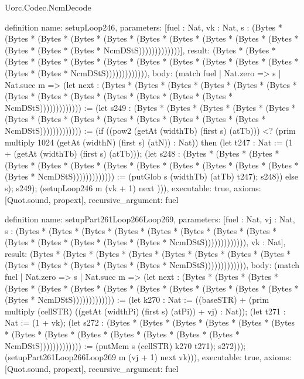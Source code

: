 \begin{lexlean}{Uorc.Codec.NcmDecode}
\begin{semanticmodule}
definition{
  name: setupLoop246,
  parameters: [fuel : Nat, vk : Nat, s : (Bytes * (Bytes * (Bytes * (Bytes * (Bytes * (Bytes * (Bytes * (Bytes * (Bytes * (Bytes * (Bytes * (Bytes * (Bytes * NcmDStS)))))))))))))],
  result: (Bytes * (Bytes * (Bytes * (Bytes * (Bytes * (Bytes * (Bytes * (Bytes * (Bytes * (Bytes * (Bytes * (Bytes * (Bytes * NcmDStS))))))))))))),
  body: (match fuel
    | Nat.zero => s
    | Nat.succ m => (let next : (Bytes * (Bytes * (Bytes * (Bytes * (Bytes * (Bytes * (Bytes * (Bytes * (Bytes * (Bytes * (Bytes * (Bytes * (Bytes * NcmDStS))))))))))))) := (let s249 : (Bytes * (Bytes * (Bytes * (Bytes * (Bytes * (Bytes * (Bytes * (Bytes * (Bytes * (Bytes * (Bytes * (Bytes * (Bytes * NcmDStS))))))))))))) := (if ((pow2 (getAt (widthTb) (first s) (atTb))) <? (prim multiply 1024 (getAt (widthN) (first s) (atN)) : Nat)) then (let t247 : Nat := (1 + (getAt (widthTb) (first s) (atTb))); (let s248 : (Bytes * (Bytes * (Bytes * (Bytes * (Bytes * (Bytes * (Bytes * (Bytes * (Bytes * (Bytes * (Bytes * (Bytes * (Bytes * NcmDStS))))))))))))) := (putGlob s (widthTb) (atTb) t247); s248)) else s); s249); (setupLoop246 m (vk + 1) next ))),
  executable: true,
  axioms: [Quot.sound, propext],
  recursive_argument: fuel
}

definition{
  name: setupPart261Loop266Loop269,
  parameters: [fuel : Nat, vj : Nat, s : (Bytes * (Bytes * (Bytes * (Bytes * (Bytes * (Bytes * (Bytes * (Bytes * (Bytes * (Bytes * (Bytes * (Bytes * (Bytes * NcmDStS))))))))))))), vk : Nat],
  result: (Bytes * (Bytes * (Bytes * (Bytes * (Bytes * (Bytes * (Bytes * (Bytes * (Bytes * (Bytes * (Bytes * (Bytes * (Bytes * NcmDStS))))))))))))),
  body: (match fuel
    | Nat.zero => s
    | Nat.succ m => (let next : (Bytes * (Bytes * (Bytes * (Bytes * (Bytes * (Bytes * (Bytes * (Bytes * (Bytes * (Bytes * (Bytes * (Bytes * (Bytes * NcmDStS))))))))))))) := (let k270 : Nat := ((baseSTR) + (prim multiply (cellSTR) ((getAt (widthPi) (first s) (atPi)) + vj) : Nat)); (let t271 : Nat := (1 + vk); (let s272 : (Bytes * (Bytes * (Bytes * (Bytes * (Bytes * (Bytes * (Bytes * (Bytes * (Bytes * (Bytes * (Bytes * (Bytes * (Bytes * NcmDStS))))))))))))) := (putMem s (cellSTR) k270 t271); s272))); (setupPart261Loop266Loop269 m (vj + 1) next vk))),
  executable: true,
  axioms: [Quot.sound, propext],
  recursive_argument: fuel
}


\end{semanticmodule}
\end{lexlean}
